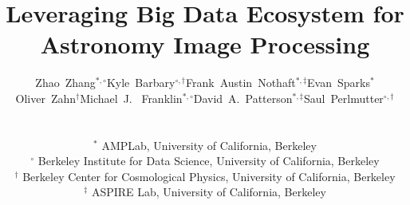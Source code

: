 \documentclass[10pt, conference, compsocconf]{IEEEtran}
\newcommand{\up}{\vspace*{-1em}}
\begin{document}
%

\title{Leveraging Big Data Ecosystem for  Astronomy Image Processing}

%
%
%
%
%

\author{
\begin{tabular}{cccc}
{Zhao~Zhang$^{*,\circ}$} & {Kyle~Barbary$^{\circ,\dagger}$} & {Frank~Austin~Nothaft$^{*,\ddagger}$} & {Evan~Sparks$^*$} \\
{Oliver~Zahn$^\dagger$} & {Michael~J.~ Franklin$^{*,\circ}$} & {David~A.~Patterson$^{*,\ddagger}$} & {Saul~Perlmutter$^{\circ,\dagger}$}
\end{tabular}
\\%
\begin{tabular}{c}
$^*$ AMPLab, University of California, Berkeley \\
$^\circ$ Berkeley Institute for Data Science, University of California, Berkeley\\
$^\dagger$ Berkeley Center for Cosmological Physics, University of California, Berkeley\\
$^\ddagger$ ASPIRE Lab, University of California, Berkeley \\
\up\up
\end{tabular}
} 
\end{document}
